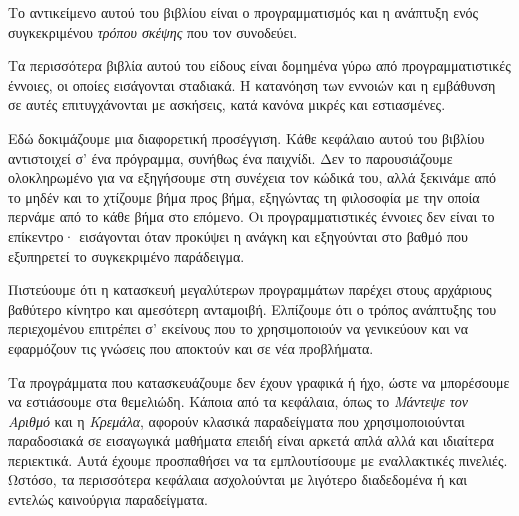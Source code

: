 \documentclass[a4paper,11pt,oneside]{book}
\begin{document}

Το αντικείμενο αυτού του βιβλίου είναι ο προγραμματισμός και η ανάπτυξη ενός συγκεκριμένου \emph{τρόπου σκέψης} που τον συνοδεύει. 

Τα περισσότερα βιβλία αυτού του είδους είναι δομημένα γύρω από προγραμματιστικές έννοιες, οι οποίες εισάγονται σταδιακά. Η κατανόηση των εννοιών και η εμβάθυνση σε αυτές επιτυγχάνονται με ασκήσεις, κατά κανόνα μικρές και εστιασμένες.

Εδώ δοκιμάζουμε μια διαφορετική προσέγγιση. Κάθε κεφάλαιο αυτού του βιβλίου αντιστοιχεί σ' ένα πρόγραμμα, συνήθως ένα παιχνίδι. Δεν το παρουσιάζουμε ολοκληρωμένο για να εξηγήσουμε στη συνέχεια τον κώδικά του, αλλά ξεκινάμε από το μηδέν και το χτίζουμε βήμα προς βήμα, εξηγώντας τη φιλοσοφία με την οποία περνάμε από το κάθε βήμα στο επόμενο. Οι προγραμματιστικές έννοιες δεν είναι το επίκεντρο· εισάγονται όταν προκύψει η ανάγκη και εξηγούνται στο βαθμό που εξυπηρετεί το συγκεκριμένο παράδειγμα.

Πιστεύουμε ότι η κατασκευή μεγαλύτερων προγραμμάτων παρέχει στους αρχάριους βαθύτερο κίνητρο και αμεσότερη ανταμοιβή. Ελπίζουμε ότι ο τρόπος ανάπτυξης του περιεχομένου επιτρέπει σ' εκείνους που το χρησιμοποιούν να γενικεύουν και να εφαρμόζουν τις γνώσεις που αποκτούν και σε νέα προβλήματα.

Τα προγράμματα που κατασκευάζουμε δεν έχουν γραφικά ή ήχο, ώστε να μπορέσουμε να εστιάσουμε στα θεμελιώδη. Κάποια από τα κεφάλαια, όπως το \emph{Μάντεψε τον Αριθμό} και η \emph{Κρεμάλα}, αφορούν κλασικά παραδείγματα που χρησιμοποιούνται παραδοσιακά σε εισαγωγικά μαθήματα επειδή είναι αρκετά απλά αλλά και ιδιαίτερα περιεκτικά. Aυτά έχουμε προσπαθήσει να τα εμπλουτίσουμε με εναλλακτικές πινελιές. Ωστόσο, τα περισσότερα κεφάλαια ασχολούνται με λιγότερο διαδεδομένα ή και εντελώς καινούργια παραδείγματα. 
\end{document}
